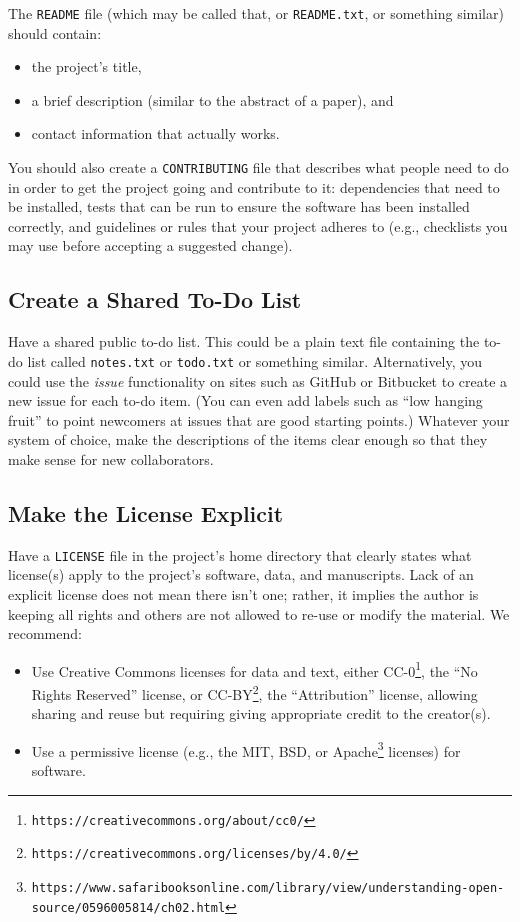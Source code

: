 \documentclass[10pt]{article}
\newcommand{\withurl}[2]{{#1}\footnote{\texttt{#2}}}
\begin{document}
The \texttt{README} file (which may be called that, or
\texttt{README.txt}, or something similar) should contain:

\begin{itemize}
\item
  the project's title,
\item
  a brief description (similar to the abstract of a paper), and
\item
  contact information that actually works.
\end{itemize}

You should also create a \texttt{CONTRIBUTING} file that describes what
people need to do in order to get the project going and contribute to
it: dependencies that need to be installed, tests that can be run to
ensure the software has been installed correctly, and guidelines or
rules that your project adheres to (e.g., checklists you may use before
accepting a suggested change).

\subsection*{Create a Shared To-Do List}

Have a shared public to-do list. This could be a plain text file
containing the to-do list called \texttt{notes.txt} or \texttt{todo.txt}
or something similar. Alternatively, you could use the \emph{issue}
functionality on sites such as GitHub or Bitbucket to create a new issue
for each to-do item. (You can even add labels such as ``low hanging
fruit'' to point newcomers at issues that are good starting points.)
Whatever your system of choice, make the descriptions of the items clear
enough so that they make sense for new collaborators.

\subsection*{Make the License Explicit}

Have a \texttt{LICENSE} file in the project's home directory that
clearly states what license(s) apply to the project's software, data,
and manuscripts. Lack of an explicit license does not mean there isn't
one; rather, it implies the author is keeping all rights and others are
not allowed to re-use or modify the material. We recommend:

\begin{itemize}
\item
  Use Creative Commons licenses for data and text, either
  \withurl{CC-0}{https://creativecommons.org/about/cc0/}, the ``No Rights
  Reserved'' license, or
  \withurl{CC-BY}{https://creativecommons.org/licenses/by/4.0/}, the
  ``Attribution'' license, allowing sharing and reuse but requiring
  giving appropriate credit to the creator(s).
\item
  Use a permissive license (e.g., the \withurl{MIT, BSD, or
    Apache}{https://www.safaribooksonline.com/library/view/understanding-open-source/0596005814/ch02.html}
  licenses) for software.
\end{itemize}
\end{document}
